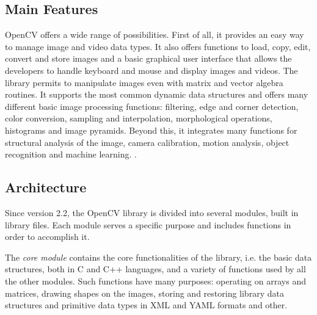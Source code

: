 	\subsection{Main Features}
	\mbox{OpenCV} offers a wide range of possibilities. First of all, it provides an easy way to manage image and video data types. It also offers functions to load, copy, edit, convert and store images and a basic graphical user interface that allows the developers to handle keyboard and mouse and display images and videos. The library permits to manipulate images even with matrix and vector algebra routines. It supports the most common dynamic data structures and offers many different basic image processing functions: filtering, edge and corner detection, color conversion, sampling and interpolation, morphological operations, histograms and image pyramids. Beyond this, it integrates many functions for structural analysis of the image, camera calibration, motion analysis, object recognition and machine learning. \cite{Agam2006}.

	
	\subsection{Architecture}
	Since version 2.2, the \mbox{OpenCV} library is divided into several modules, built in library files. Each module serves a specific purpose and includes functions in order to accomplish it. 

	The \emph{core module} contains the core functionalities of the library, i.e. the basic data structures, both in C and \mbox{C++} languages, and a variety of functions used by all the other modules. Such functions have many purposes: operating on arrays and matrices, drawing shapes on the images, storing and restoring library data structures and primitive data types in \mbox{XML} and \mbox{YAML} formats and other.
	
